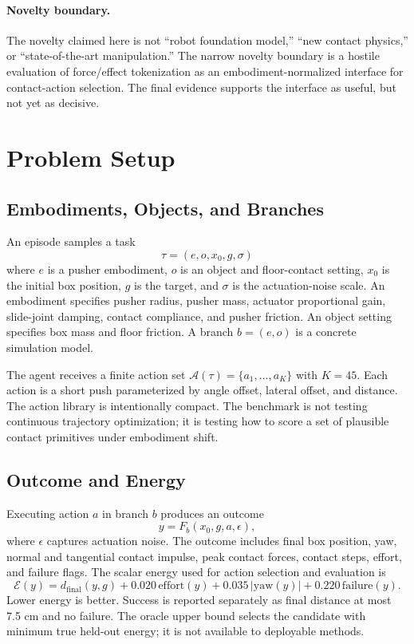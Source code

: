 \documentclass{article}
\newcommand{\energy}{\mathcal{E}}
\newcommand{\actions}{\mathcal{A}}
\begin{document}
\paragraph{Novelty boundary.}
The novelty claimed here is not ``robot foundation model,'' ``new contact physics,'' or ``state-of-the-art manipulation.'' The narrow novelty boundary is a hostile evaluation of force/effect tokenization as an embodiment-normalized interface for contact-action selection. The final evidence supports the interface as useful, but not yet as decisive.

\section{Problem Setup}

\subsection{Embodiments, Objects, and Branches}

An episode samples a task
\[
  \tau = (e, o, x_0, g, \sigma)
\]
where $e$ is a pusher embodiment, $o$ is an object and floor-contact setting, $x_0$ is the initial box position, $g$ is the target, and $\sigma$ is the actuation-noise scale. An embodiment specifies pusher radius, pusher mass, actuator proportional gain, slide-joint damping, contact compliance, and pusher friction. An object setting specifies box mass and floor friction. A branch $b=(e,o)$ is a concrete simulation model.

The agent receives a finite action set $\actions(\tau)=\{a_1,\ldots,a_K\}$ with $K=45$. Each action is a short push parameterized by angle offset, lateral offset, and distance. The action library is intentionally compact. The benchmark is not testing continuous trajectory optimization; it is testing how to score a set of plausible contact primitives under embodiment shift.

\subsection{Outcome and Energy}

Executing action $a$ in branch $b$ produces an outcome
\[
  y = F_b(x_0,g,a,\epsilon),
\]
where $\epsilon$ captures actuation noise. The outcome includes final box position, yaw, normal and tangential contact impulse, peak contact forces, contact steps, effort, and failure flags. The scalar energy used for action selection and evaluation is
\[
  \energy(y) =
  d_{\mathrm{final}}(y,g)
  + 0.020\,\mathrm{effort}(y)
  + 0.035\,|\mathrm{yaw}(y)|
  + 0.220\,\mathrm{failure}(y).
\]
Lower energy is better. Success is reported separately as final distance at most 7.5 cm and no failure. The oracle upper bound selects the candidate with minimum true held-out energy; it is not available to deployable methods.
\end{document}
